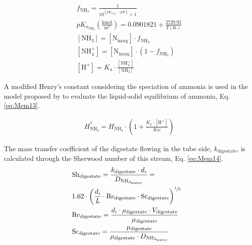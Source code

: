 \begin{refsection}[referencesApD]
\begin{align}
&  f_{\text{NH}_3} = \frac{1}{10^{\left(pK_{a_{\text{NH}_3}}-pH\right)}+1} \label{eq:Mem8} 
\\
&  pK_{a_{\text{NH}_3}} \left(\frac{\text{kmol}}{\text{m}^3}\right) = 0.0901821+\frac{2729.92}{T(\text{K})} \label{eq:Mem11} 
\\
&  \left[{\text{NH}_3}\right] = \left[{\text{N}_\text{inorg}}\right] \cdot f_{\text{NH}_3} \label{eq:Mem9} 
\\
&  \left[{\text{NH}_4^+}\right] = \left[{\text{N}_\text{inorg}}\right] \cdot \left(1-f_{\text{NH}_3}\right) \label{eq:Mem10} 
\\
&  \left[{\text{H}^+}\right] = K_a \cdot \frac{\left[{\text{NH}_4^+}\right]}{\left[{\text{NH}_3}\right]} \label{eq:Mem12} 
\end{align}

A modified Henry's constant considering the speciation of ammonia is used in the model proposed by \citet{rongwong2020modelin} to evaluate the liquid-solid equilibrium of ammonia, Eq. \ref{eq:Mem13}.

\begin{align}
&  H_{\text{NH}_3}^* = H_{\text{NH}_3} \cdot \left(1+\frac{K_a \cdot \left[{\text{H}^+}\right]}{Kw}\right) \label{eq:Mem13}  
\end{align}

The mass transfer coefficient of the digestate flowing in the tube side, $k_{\text{digestate}}$, is calculated through the Sherwood number of this stream, Eq. \ref{eq:Mem14}.
\begin{align}
&  \text{Sh}_{\text{digestate}} = \frac{k_{\text{digestate}} \cdot d_i}{D_{\text{NH}_{3_\text{water}}}} = \label{eq:Mem14} \\
& 1.62 \cdot \left(\frac{d_i}{L} \cdot \text{Re}_{\text{digestate}} \cdot \text{Sc}_{\text{digestate}}\right)^{\sfrac{1}{3}} \nonumber
\\
&  \text{Re}_{\text{digestate}} = \frac{d_i \cdot \rho_{\text{digestate}} \cdot V_{\text{digestate}}}{\mu_{\text{digestate}}} \label{eq:Mem15}
\\
&  \text{Sc}_{\text{digestate}} = \frac{\mu_{\text{digestate}}}{\rho_{\text{digestate}} \cdot D_{\text{NH}_{3_\text{water}}}} \label{eq:Mem16}
\end{align}


\end{refsection}
